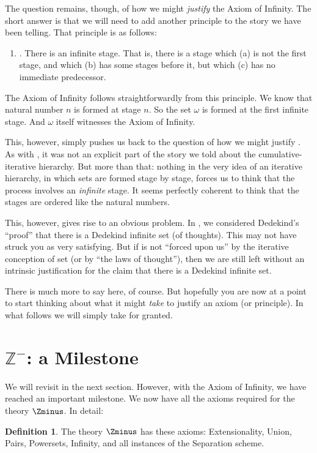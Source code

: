 \documentclass[10pt,a4paper]{article}
\makeatletter
\theoremstyle{plain}
\theoremstyle{definition}
\newtheorem{defn}[thm]{Definition}
\theoremstyle{remark}
\newcommand*{\olfileid}[3]{}
\newcommand*{\olsection}[1]{\section*{#1}}
\newcommand{\olref}{\@ifnextchar[{\olref@i}{\olref@final}}
\def\olref@i[#1]{\@ifnextchar[{\olref@ii}{\olref@final}}
\def\olref@ii[#1]{\@ifnextchar[{\olref@iii}{\olref@final}}
\def\olref@iii[#1]{\olref@final}
\def\olref@final#1{\ref{#1}}
\providecommand{\Z}{\mathbb{Z}}
\makeatother
\begin{document}
The question remains, though, of how we might \emph{justify} the Axiom
of Infinity. The short answer is that we will need to add another
principle to the story we have been telling. That principle is as
follows:
\begin{enumerate}
	\item[] \stagesinf. There is an infinite stage. That is, there is a stage which (a) is not the first stage, and which (b) has some stages before it, but which (c) has no immediate predecessor.
\end{enumerate}
The Axiom of Infinity follows straightforwardly from this principle.
We know that natural number $n$ is formed at stage $n$. So the set
$\omega$ is formed at the first infinite stage. And $\omega$ itself
witnesses the Axiom of Infinity. 

This, however, simply pushes us back to the question of how we might
justify \stagesinf. As with \stagessucc, it was not an explicit part
of the story we told about the cumulative-iterative hierarchy. But
more than that: nothing in the very idea of an iterative hierarchy, in
which sets are formed stage by stage, forces us to think that the
process involves an \emph{infinite} stage. It seems perfectly coherent
to think that the stages are ordered like the natural numbers. 

This, however, gives rise to an obvious problem. In
\olref[sfr][infinite][dedekindsproof]{sec}, we considered
Dedekind's ``proof'' that there is a Dedekind infinite set (of
thoughts). This may not have struck you as very satisfying. But if
\stagesinf{} is not ``forced upon us'' by the iterative conception of
set (or by ``the laws of thought''), then we are still left without an
intrinsic justification for the claim that there is a Dedekind
infinite set.

There is much more to say here, of course. But hopefully you are now
at a point to start thinking about what it might \emph{take} to
justify an axiom (or principle). In what follows we will simply take
\stagesinf{} for granted.



\olfileid{sth}{z}{milestone}
\olsection{$\Z^-$: a Milestone}

We will revisit \stagesinf{} in the next section. However, with the
Axiom of Infinity, we have reached an important milestone. We now have
all the axioms required for the theory $\Zminus$. In detail:

\begin{defn}
The theory $\Zminus$ has these axioms: Extensionality, Union, Pairs, Powersets, Infinity, and all instances of the Separation scheme.
\end{defn}
\end{document}
